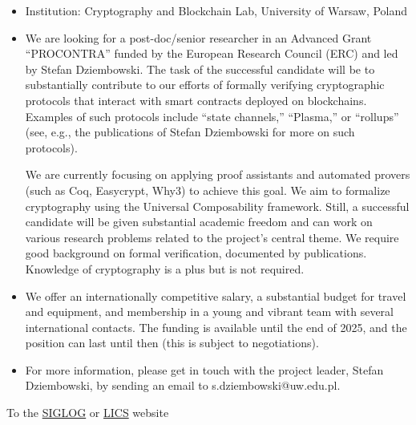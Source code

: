 \documentclass[prodmode,acmtecs]{acmsmall} %
\begin{document}
\begin{itemize}\item  Institution: Cryptography and Blockchain Lab, University of Warsaw, Poland 
 
\item  We are looking for a post-doc/senior researcher in an Advanced Grant “PROCONTRA” funded by the European Research Council (ERC) and led by Stefan Dziembowski. The task of the successful candidate will be to substantially contribute to our efforts of formally verifying cryptographic protocols that interact with smart contracts deployed on blockchains. Examples of such protocols include “state channels,” “Plasma,” or “rollups” (see, e.g., the publications of Stefan Dziembowski for more on such protocols). 
 
  We are currently focusing on applying proof assistants and automated provers (such as Coq, Easycrypt, Why3) to achieve this goal. We aim to formalize cryptography using the Universal Composability framework. Still, a successful candidate will be given substantial academic freedom and can work on various research problems related to the project’s central theme. We require good background on formal verification, documented by publications. Knowledge of cryptography is a plus but is not required. 
 
\item  We offer an internationally competitive salary, a substantial budget for travel and equipment, and membership in a young and vibrant team with several international contacts. The funding is available until the end of 2025, and the position can last until then (this is subject to negotiations). 
 
\item  For more information, please get in touch with the project leader, Stefan Dziembowski, by sending an email to s.dziembowski@uw.edu.pl.  
 
\end{itemize}


To the \href{http://siglog.org/}{SIGLOG} or \href{https://lics.siglog.org}{LICS} website
\end{document}
